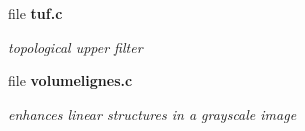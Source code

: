 \begin{CompactItemize}
\item 
file \bf{tuf.c}
\begin{CompactList}\small\item\em topological upper filter \item\end{CompactList}

\item 
file \bf{volumelignes.c}
\begin{CompactList}\small\item\em enhances linear structures in a grayscale image \item\end{CompactList}

\end{CompactItemize}

